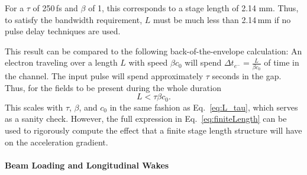 For a $\tau$ of 250\,fs and $\beta$ of 1, this corresponds to a stage length of 2.14 mm. Thus, to satisfy the bandwidth requirement, $L$ must be much less than 2.14\,mm if no pulse delay techniques are used. 

This result can be compared to the following back-of-the-envelope calculation: An electron traveling over a length $L$ with speed $\beta c_0$ will spend $\Delta t_{e^-} = \frac{L}{\beta c_0}$ of time in the channel. The input pulse will spend approximately $\tau$ seconds in the gap. Thus, for the fields to be present during the whole duration
\begin{equation}
L < \tau \beta c_0.
\end{equation}
This scales with $\tau$, $\beta$, and $c_0$ in the same fashion as Eq.~\ref{eq:L_tau}, which serves as a sanity check.  However, the full expression in Eq.~\ref{eq:finiteLength} can be used to rigorously compute the effect that a finite stage length structure will have on the acceleration gradient.

\paragraph{Beam Loading and Longitudinal Wakes}

